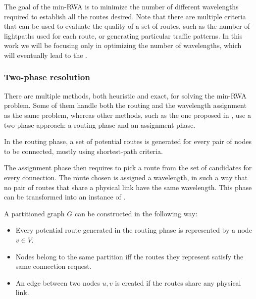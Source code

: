 The goal of the min-RWA is to minimize the number of different wavelengths required to establish all the routes desired. Note that there are multiple criteria that can be used to evaluate the quality of a set of routes, such as the number of lightpaths used for each route, or generating particular traffic patterns. In this work we will be focusing only in optimizing the number of wavelengths, which will eventually lead to the \PCP{}.

\subsubsection*{Two-phase resolution}

There are multiple methods, both heuristic and exact, for solving the min-RWA problem. Some of them handle both the routing and the wavelength assignment as the same problem, whereas other methods, such as the one proposed in \cite{Li00thepartition}, use a two-phase approach: a routing phase and an assignment phase.

In the routing phase, a set of potential routes is generated for every pair of nodes to be connected, mostly using shortest-path criteria.

The assignment phase then requires to pick a route from the set of candidates for every connection. The route chosen is assigned a wavelength, in such a way that no pair of routes that share a physical link have the same wavelength. This phase can be transformed into an instance of \PCP{}.

A partitioned graph $G$ can be constructed in the following way:
\begin{itemize}
\item{Every potential route generated in the routing phase is represented by a node $v \in V$.}
\item{Nodes belong to the same partition iff the routes they represent satisfy the same connection request.}
\item{An edge between two nodes $u,v$ is created if the routes share any physical link.}
\end{itemize}


